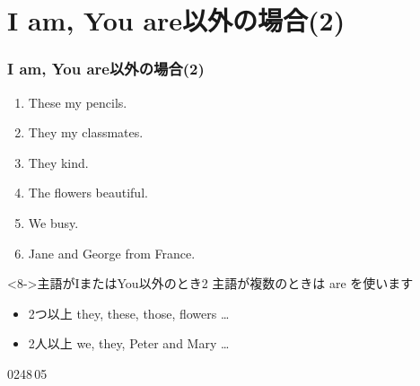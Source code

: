 \documentclass[aspectratio=169,xcolor={dvipsnames,table}]{beamer}
\begin{document}
\section{I am, You are以外の場合(2)}

\begin{frame}[plain]\frametitle{I am, You are以外の場合(2)}
  \begin{enumerate}
   \item<1-> These \textbf{\color{Maroon}{are}} my pencils. \hfill{}
   \item<1-> They \textbf{\color{Maroon}{are}} my classmates. \hfill{}
   \item<1-> They \textbf{\color{Maroon}{are}} kind. \hfill{}
   \item<1-> The flowers \textbf{\color{Maroon}{are}} beautiful. \hfill{}
   \item<1-> We \textbf{\color{Maroon}{are}} busy. \hfill{}
   \item<1-> Jane and George \textbf{\color{Maroon}{are}} from France. \hfill{}
  \end{enumerate}

\bigskip

\begin{block}<8->{主語がIまたはYou以外のとき2}\small
主語が複数のときは are を使います
\begin{itemize}[square]\small
 \item 2つ以上 they, these, those, flowers \ldots
 \item 2人以上 we, they, Peter and Mary \ldots
\end{itemize}
     \end{block}


\hfill{\tiny 0248}\,{\tiny {}05}

\end{frame}
\end{document}
